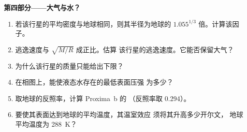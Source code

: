 \begin{problem}
\medskip
\noindent\textbf{第四部分——大气与水？}
\begin{enumerate}[resume]
  \item 若该行星的平均密度与地球相同，则其半径为地球的
        $1.055^{1/3}$ 倍。计算该因子。
  \item 逃逸速度与 $\sqrt{M/R}$ 成正比。估算
        该行星的逃逸速度。它能否保留大气？
  \item 为什么该行星的质量只能给出下限？
  \item 在相图上，能使液态水存在的最低表面压强
        为多少？
  \item 取地球的反照率，计算 Proxima~b 的
        （反照率取 0.294）。
  \item 要使其表面达到地球的平均温度，其温室效应
        须将其升高多少开尔文，
        地球平均温度为 \qty{288}{K}？
\end{enumerate}
\end{problem}
